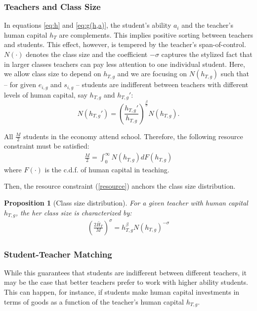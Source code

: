 \documentclass[onehalfspacing,11pt]{article}
\newtheorem{prp}{Proposition}
\begin{document}

\subsubsection{Teachers and Class Size}
In equations \eqref{eq:h} and \eqref{eq:g(h,a)}, the student's ability $a_i$ and the teacher's human capital $h_T$ are complements. This implies positive sorting between teachers and students. This effect, however, is tempered by the teacher's span-of-control. $N(\cdot)$ denotes the class size and the coefficient $-\sigma$ captures the stylized fact that in larger classes teachers can pay less attention to one individual student. Here, we allow class size to depend on $h_{T,g}$ and we are focusing on $N(h_{T,g})$ such that -- for given $e_{i,g}$ and $s_{i,g}$ -- students are indifferent between teachers with different levels of human capital, say $h_{T,g}$ and ${h_{T,g}}'$:
 \begin{equation}
\label{ }
N({h_{T,g}}') = \left(\frac{{h_{T,g}}'}{{h_{T,g}}}\right)^{\frac{\beta}{\sigma}} N({h_{T,g}}).
\end{equation}

All $\frac{M}{2}$ students in the economy attend school. Therefore, the following resource constraint must be satisfied:
\begin{align}
\label{resource}
\frac{M}{2}=\int_0^\infty N(h_{T,g})dF(h_{T,g}) 
\end{align}
where $F(\cdot)$ is the c.d.f. of human capital in teaching.

Then, the resource constraint (\ref{resource}) anchors the class size distribution.
\begin{prp}[Class size distribution] For a given teacher with human capital $h_{T,g}$, the her class size is characterized by:
\begin{align}
  \left(\frac{2\widetilde{H_T}}{M}\right)^\sigma=h_{T,g}^\beta N(h_{T,g})^{-\sigma}
\end{align}
\end{prp}

\subsubsection{Student-Teacher Matching}
While this guarantees that students are indifferent between different teachers, it may be the case that better teachers prefer to work with higher ability students. This can happen, for instance, if students make human capital investments in terms of goods as a function of the teacher's human capital $h_{T,g}$. 
\end{document}
